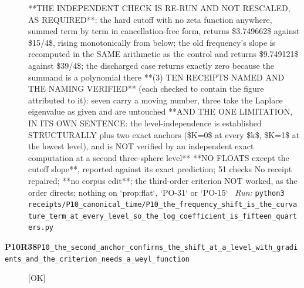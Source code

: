 \begin{description}
**THE INDEPENDENT CHECK IS RE-RUN AND NOT RESCALED, AS REQUIRED**: the hard cutoff with no zeta function anywhere, summed term by term in cancellation-free form, returns \$3.749662\$ against \$15/4\$, rising monotonically from below; the old frequency's slope is recomputed in the SAME arithmetic as the control and returns \$9.749121\$ against \$39/4\$; the discharged case returns exactly zero because the summand is a polynomial there  **(3) TEN RECEIPTS NAMED AND THE NAMING VERIFIED** (each checked to contain the figure attributed to it): seven carry a moving number, three take the Laplace eigenvalue as given and are untouched  **AND THE ONE LIMITATION, IN ITS OWN SENTENCE: the level-independence is established STRUCTURALLY plus two exact anchors (\$K=0\$ at every \$k\$, \$K=1\$ at the lowest level), and is NOT verified by an independent exact computation at a second three-sphere level**  **NO FLOATS except the cutoff slope**, reported against its exact prediction; 51 checks  No receipt repaired; **no corpus edit**; the third-order criterion NOT worked, as the order directs; nothing on `prop:flat`, `PO-31` or `PO-15`
\ \emph{Run:} \texttt{python3 receipts/P10\_canonical\_time/P10\_the\_frequency\_shift\_is\_the\_curvature\_term\_at\_every\_level\_so\_the\_log\_coefficient\_is\_fifteen\_quarters.py}
\item[\rcptlabel{P10_the_second_anchor_confirms_the_shift_at_a_level_with_gradients_and_the_criterion_needs_a_weyl_function}{P10R38}\textbf{P10R38}\quad\texttt{P10\_the\_second\_anchor\_confirms\_the\_shift\_at\_a\_level\_with\_gradients\_and\_the\_criterion\_needs\_a\_weyl\_function}]\hfill\textsf{[OK]}\\

\end{description}
